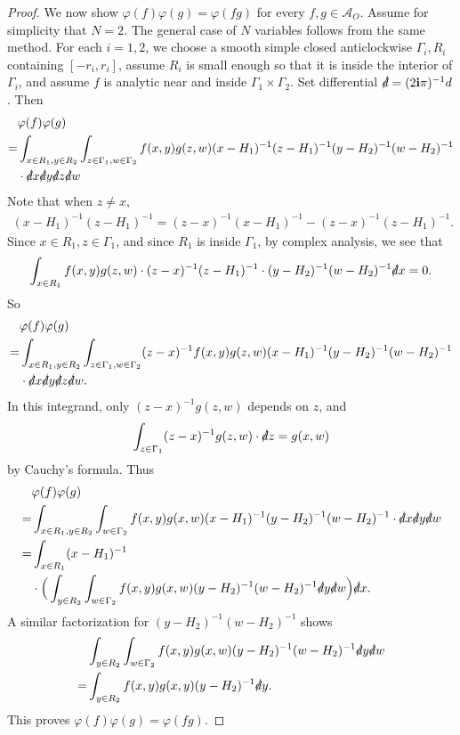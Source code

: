 \documentclass[12pt,a4paper,notitlepage]{article}
\theoremstyle{definition}
\theoremstyle{plain}
\newcommand{\mc}{\mathcal}
\newcommand{\di}{\slashed d}
\newcommand{\im}{\mathbf{i}}
\numberwithin{equation}{section}
\begin{document}
\begin{proof}
We now show $\varphi(f)\varphi(g)=\varphi(fg)$ for every $f,g\in \mc A_O$. Assume for simplicity that $N=2$. The general case of $N$ variables follows from the same method. For each $i=1,2$, we choose a smooth simple closed anticlockwise $\Gamma_i,R_i$ containing $[-r_i,r_i]$,  assume $R_i$ is small enough so that it is inside the interior of $\Gamma_i$, and assume $f$ is analytic near and inside $\Gamma_1\times \Gamma_2$. Set differential $\di=(2\im\pi)^{-1}d$. Then
\begin{align*}
&\varphi(f)\varphi(g)\\
=&\int_{x\in R_1,y\in R_2}\int_{z\in\Gamma_1,w\in \Gamma_2}f(x,y)g(z,w)(x-H_1)^{-1}(z-H_1)^{-1}(y-H_2)^{-1}(w-H_2)^{-1}\\
&\cdot\di x\di y \di z \di w
\end{align*}
Note that when $z\neq x$,
\begin{align*}
(x-H_1)^{-1}(z-H_1)^{-1}=(z-x)^{-1}(x-H_1)^{-1}-(z-x)^{-1}(z-H_1)^{-1}.
\end{align*}
Since $x\in R_1,z\in\Gamma_1$, and since $R_1$ is inside $\Gamma_1$, by complex analysis, we see that 
\begin{align*}
\int_{x\in R_1}f(x,y)g(z,w)\cdot (z-x)^{-1}(z-H_1)^{-1}\cdot (y-H_2)^{-1}(w-H_2)^{-1}\di x=0.
\end{align*}
So
\begin{align*}
&\varphi(f)\varphi(g)\\
=&\int_{x\in R_1,y\in R_2}\int_{z\in\Gamma_1,w\in \Gamma_2}(z-x)^{-1}f(x,y)g(z,w)(x-H_1)^{-1}(y-H_2)^{-1}(w-H_2)^{-1}\\
&\cdot \di x\di y \di z \di w.
\end{align*}
In this integrand, only $(z-x)^{-1}g(z,w)$ depends on $z$, and
\begin{align*}
\int_{z\in\Gamma_1}	(z-x)^{-1}g(z,w)\cdot \di z= g(x,w) 
\end{align*}
by Cauchy's formula. Thus
\begin{align*}
&\varphi(f)\varphi(g)\\
=&\int_{x\in R_1,y\in R_2}\int_{w\in \Gamma_2}f(x,y)g(x,w)(x-H_1)^{-1}(y-H_2)^{-1}(w-H_2)^{-1}\cdot \di x\di y \di w\\
=&\int_{x\in R_1}(x-H_1)^{-1}\\
&\cdot\Big(\int_{y\in R_2}\int_{w\in\Gamma_2}f(x,y)g(x,w)(y-H_2)^{-1}(w-H_2)^{-1} \di y\di w\Big)\di x.
\end{align*}
A similar factorization for $(y-H_2)^{-1}(w-H_2)^{-1}$ shows
\begin{align*}
&\int_{y\in R_2}\int_{w\in\Gamma_2}f(x,y)g(x,w)(y-H_2)^{-1}(w-H_2)^{-1} \di y\di w\\
=&\int_{y\in R_2}f(x,y)g(x,y)(y-H_2)^{-1}\di y.
\end{align*}
This proves $\varphi(f)\varphi(g)=\varphi(fg)$. 



\end{proof}
\end{document}

